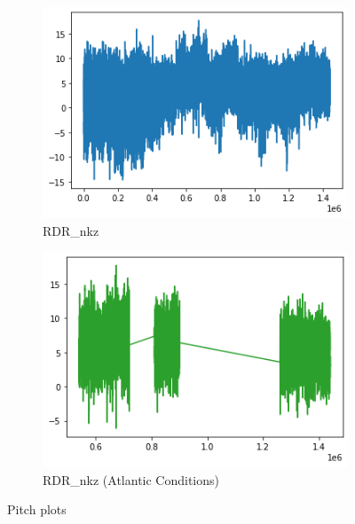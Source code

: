 \begin{figure}[h]
     \centering
     \begin{subfigure}[t]{0.49\textwidth}
         \centering
         \includegraphics[width=\textwidth]{figures/distributions/RDR-Pitch.png}
         \caption{RDR\_nkz}
     \end{subfigure}
     \hfill
     \begin{subfigure}[t]{0.49\textwidth}
         \centering
         \includegraphics[width=\textwidth]{figures/distributions/RDR-atlantic-Pitch.png}
         \caption{RDR\_nkz (Atlantic Conditions)}
     \end{subfigure}
        \label{fig:rdr-tws}
        \caption{Pitch plots}
\end{figure}
